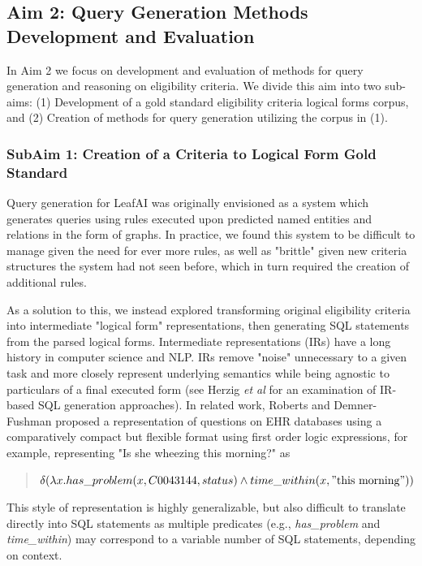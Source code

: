 \documentclass[../main.tex]{subfiles}
\begin{document}
\subsection{Aim 2: Query Generation Methods Development and Evaluation}

In Aim 2 we focus on development and evaluation of methods for query generation and reasoning on eligibility criteria. We divide this aim into two sub-aims: (1) Development of a gold standard eligibility criteria logical forms corpus, and (2) Creation of methods for query generation utilizing the corpus in (1).

\subsubsection{SubAim 1: Creation of a Criteria to Logical Form Gold Standard}

Query generation for LeafAI was originally envisioned as a system which generates queries using rules executed upon predicted named entities and relations in the form of graphs. In practice, we found this system to be difficult to manage given the need for ever more rules, as well as "brittle" given new criteria structures the system had not seen before, which in turn required the creation of additional rules.

As a solution to this, we instead explored transforming original eligibility criteria into intermediate "logical form" representations, then generating SQL statements from the parsed logical forms. Intermediate representations (IRs) have a long history in computer science and NLP. IRs remove "noise" unnecessary to a given task and more closely represent underlying semantics while being agnostic to particulars of a final executed form (see Herzig \textit{et al} \cite{herzig2021unlocking} for an examination of IR-based SQL generation approaches). In related work, Roberts and Demner-Fushman \cite{roberts2016annotating} proposed a representation of questions on EHR databases using a comparatively compact but flexible format using first order logic expressions, for example, representing "Is she wheezing this morning?" as

\begin{quote}
    \centering
    $\delta( \lambda x.has\_problem(x, C0043144, status) \wedge time\_within(x, \mathrm{"this\ morning"}))$
\end{quote}

\noindent This style of representation is highly generalizable, but also difficult to translate directly into SQL statements as multiple predicates (e.g., \textit{has\_problem} and \textit{time\_within}) may correspond to a variable number of SQL statements, depending on context.
\end{document}
